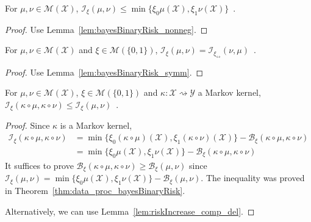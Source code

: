 \begin{lemma}
  \label{lem:statInfo_le}
  \leanok
  For $\mu, \nu \in \mathcal M(\mathcal X)$, $\mathcal I_\xi(\mu, \nu) \le \min\{\xi_0 \mu(\mathcal X), \xi_1 \nu(\mathcal X)\}$~.
\end{lemma}

\begin{proof}\leanok
{}
Use Lemma~\ref{lem:bayesBinaryRisk_nonneg}.
\end{proof}


\begin{lemma}
  \label{lem:statInfo_symm}
  \leanok
  For $\mu, \nu \in \mathcal M(\mathcal X)$ and $\xi \in \mathcal M(\{0,1\})$, $\mathcal I_\xi(\mu, \nu) = \mathcal I_{\xi_\leftrightarrow}(\nu, \mu)$~.
\end{lemma}

\begin{proof}\leanok
{}
Use Lemma~\ref{lem:bayesBinaryRisk_symm}.
\end{proof}


\begin{theorem}
  \label{thm:data_proc_statInfo}
  \leanok
  For $\mu, \nu \in \mathcal M(\mathcal X)$, $\xi \in \mathcal M(\{0,1\})$ and $\kappa : \mathcal X \rightsquigarrow \mathcal Y$ a Markov kernel, $\mathcal I_\xi(\kappa \circ \mu, \kappa \circ \nu) \le \mathcal I_\xi(\mu, \nu)$~.
\end{theorem}

\begin{proof}\leanok
{}
Since $\kappa$ is a Markov kernel,
\begin{align*}
\mathcal I_\xi(\kappa \circ \mu, \kappa \circ \nu)
&= \min\{\xi_0(\kappa \circ \mu)(\mathcal X), \xi_1(\kappa \circ \nu)(\mathcal X)\} - \mathcal B_\xi(\kappa \circ \mu, \kappa \circ \nu)
\\
&= \min\{\xi_0 \mu(\mathcal X), \xi_1 \nu(\mathcal X)\} - \mathcal B_\xi(\kappa \circ \mu, \kappa \circ \nu)
\end{align*}
It suffices to prove $\mathcal B_\xi(\kappa \circ \mu, \kappa \circ \nu) \ge \mathcal B_\xi(\mu, \nu)$ since $\mathcal I_\xi(\mu, \nu) = \min\{\xi_0\mu(\mathcal X), \xi_1\nu(\mathcal X)\} - \mathcal B_\xi(\mu, \nu)$.
The inequality was proved in Theorem~\ref{thm:data_proc_bayesBinaryRisk}.

Alternatively, we can use Lemma~\ref{lem:riskIncrease_comp_del}.
\end{proof}


